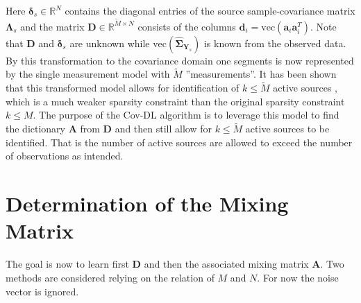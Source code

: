 Here $\boldsymbol{\delta}_s \in \mathbb{R}^{N}$ contains the diagonal entries of the source sample-covariance matrix $\boldsymbol{\Lambda}_s$
and the matrix $\mathbf{D} \in \mathbb{R}^{\widetilde{M} \times N}$ consists of the columns $\mathbf{d}_i = \text{vec}(\mathbf{a}_i \mathbf{a}_i^T)$. Note that $\mathbf{D}$ and $\boldsymbol{\delta}_s$ are unknown while $\text{vec}(\widehat{\boldsymbol{\Sigma}}_{\mathbf{Y}_s})$ is known from the observed data.
By this transformation to the covariance domain one segments is now represented by the single measurement model with $\widetilde{M}$ ''measurements''. It has been shown that this transformed model allows for identification of $k\leq \widetilde{M}$ active sources \cite{Pal2015}, which is a much weaker sparsity constraint than the original sparsity constraint $k\leq M$. 
The purpose of the Cov-DL algorithm is to leverage this model to find the dictionary $\textbf{A}$ from $\textbf{D}$ and then still allow for $k\leq \widetilde{M}$ active sources to be identified. That is the number of active sources are allowed to exceed the number of observations as intended.

\section{Determination of the Mixing Matrix}
The goal is now to learn first $\textbf{D}$ and then the associated mixing matrix $\textbf{A}$. Two methods are considered relying on the relation of $M$ and $N$. For now the noise vector is ignored.   





